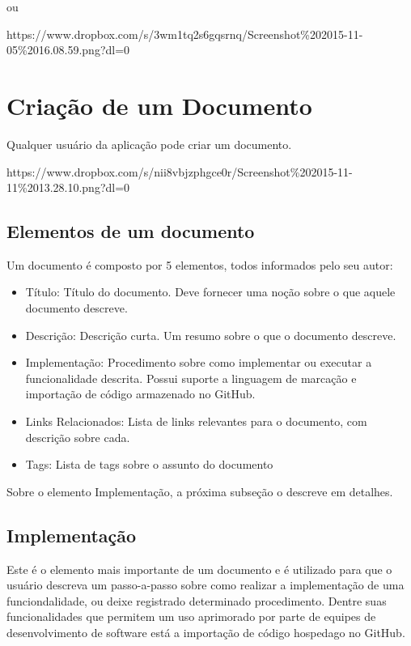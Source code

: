 ou

https://www.dropbox.com/s/3wm1tq2s6gqsrnq/Screenshot\%202015-11-05\%2016.08.59.png?dl=0

\section{Criação de um Documento}

Qualquer usuário da aplicação pode criar um documento.

https://www.dropbox.com/s/nii8vbjzphgce0r/Screenshot\%202015-11-11\%2013.28.10.png?dl=0

\subsection{Elementos de um documento}

Um documento é composto por 5 elementos, todos informados pelo seu autor:

\begin{itemize}
  \item Título: Título do documento. Deve fornecer uma noção sobre o que aquele documento descreve.
  \item Descrição: Descrição curta. Um resumo sobre o que o documento descreve.
  \item Implementação: Procedimento sobre como implementar ou executar a funcionalidade descrita. Possui suporte a linguagem de marcação e importação de código armazenado no GitHub.
  \item Links Relacionados: Lista de links relevantes para o documento, com descrição sobre cada.
  \item Tags: Lista de tags sobre o assunto do documento
\end{itemize}

Sobre o elemento Implementação, a próxima subseção o descreve em detalhes.

\subsection{Implementação}

Este é o elemento mais importante de um documento e é utilizado para que o usuário descreva um passo-a-passo sobre
como realizar a implementação de uma funciondalidade, ou deixe registrado determinado procedimento. Dentre suas funcionalidades que permitem um uso aprimorado por parte de equipes de desenvolvimento de software está a importação de código hospedago no GitHub.

